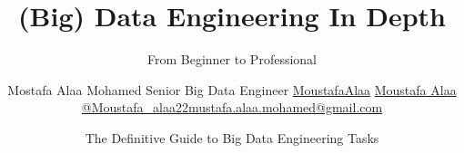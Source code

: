 \title[Data Engineering In Depth] %
{(Big) Data Engineering In Depth}

\subtitle{From Beginner to Professional}

\author[Moustafa Alaa] %
{Mostafa Alaa Mohamed \newline Senior Big Data Engineer \newline 
	\faGithub \space \href{https://github.com/moustafaalaa/}{MoustafaAlaa}	
	\faLinkedin \space \href{https://www.linkedin.com/in/moustafa-alaa/}{Moustafa Alaa}
	\faTwitter \space \href{https://twitter.com/moustafa_alaa22}{@Moustafa\_alaa22}\newline	\faEnvelope \space \href{mailto: mustafa.alaa.mohamed@gmail.com}{mustafa.alaa.mohamed@gmail.com} 
}



\date[\today] %
{The Definitive Guide to Big Data Engineering Tasks}



